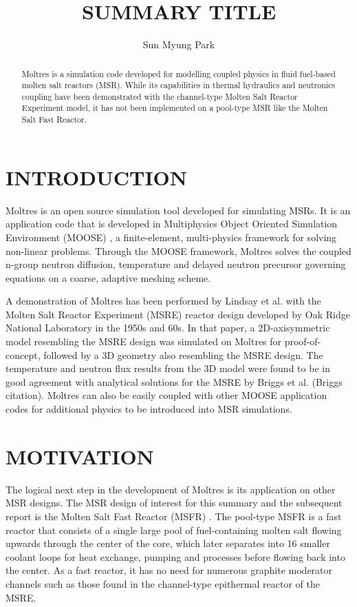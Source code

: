 \documentclass[letterpaper]{mandc2019}
\begin{document}
\title{SUMMARY TITLE}
\author{Sun Myung Park}

\maketitle
\justify

\begin{abstract}
Moltres is a simulation code developed for modelling coupled physics in fluid fuel-based molten salt reactors (MSR). While its capabilities in thermal hydraulics and neutronics coupling have been demonstrated with the channel-type Molten Salt Reactor Experiment model, it has not been implemented on a pool-type MSR like the Molten Salt Fast Reactor. 
\end{abstract}

\section{INTRODUCTION}

Moltres is an open source simulation tool developed for simulating MSRs. It is an application code that is developed in Multiphysics Object Oriented Simulation Environment (MOOSE) \cite{gaston_moose:_2009}, a finite-element, multi-physics framework for solving non-linear problems. Through the MOOSE framework, Moltres solves the coupled n-group neutron diffusion, temperature and delayed neutron precursor governing equations on a coarse, adaptive meshing scheme. 

A demonstration of Moltres has been performed by Lindsay et al. \cite{lindsay_introduction_2018} with the Molten Salt Reactor Experiment (MSRE) reactor design developed by Oak Ridge National Laboratory in the 1950s and 60s. In that paper, a 2D-axisymmetric model resembling the MSRE design was simulated on Moltres for proof-of-concept, followed by a 3D geometry also resembling the MSRE design. The temperature and neutron flux results from the 3D model were found to be in good agreement with analytical solutions for the MSRE by Briggs et al. (Briggs citation). Moltres can also be easily coupled with other MOOSE application codes for additional physics to be introduced into MSR simulations.

\section{MOTIVATION}

The logical next step in the development of Moltres is its application on other MSR designs. The MSR design of interest for this summary and the subsequent report is the Molten Salt Fast Reactor (MSFR) \cite{serp_molten_2014}. The pool-type MSFR is a fast reactor that consists of a single large pool of fuel-containing molten salt flowing upwards through the center of the core, which later separates into 16 smaller coolant loops for heat exchange, pumping and processes before flowing back into the center. As a fast reactor, it has no need for numerous graphite moderator channels such as those found in the channel-type epithermal reactor of the MSRE.
\end{document}
